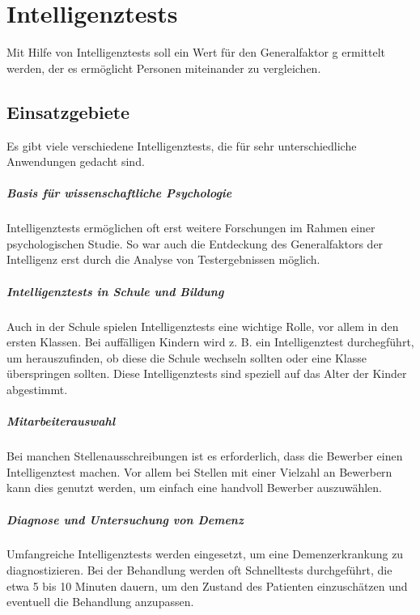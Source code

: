 \chapter{Intelligenztests}
Mit Hilfe von Intelligenztests soll ein Wert für den Generalfaktor g ermittelt werden, der es ermöglicht Personen miteinander zu vergleichen.

\section{Einsatzgebiete}
Es gibt viele verschiedene Intelligenztests, die für sehr unterschiedliche Anwendungen gedacht sind.

\paragraph{Basis für wissenschaftliche Psychologie}
Intelligenztests ermöglichen oft erst weitere Forschungen im Rahmen einer psychologischen Studie. So war auch die Entdeckung des Generalfaktors der Intelligenz erst durch die Analyse von Testergebnissen möglich.

\paragraph{Intelligenztests in Schule und Bildung}
Auch in der Schule spielen Intelligenztests eine wichtige Rolle, vor allem in den ersten Klassen. Bei auffälligen Kindern wird z. B. ein Intelligenztest durchegführt, um herauszufinden, ob diese die Schule wechseln sollten oder eine Klasse überspringen sollten. Diese Intelligenztests sind speziell auf das Alter der Kinder abgestimmt.

\paragraph{Mitarbeiterauswahl}
Bei manchen Stellenausschreibungen ist es erforderlich, dass die Bewerber einen Intelligenztest machen. Vor allem bei Stellen mit einer Vielzahl an Bewerbern kann dies genutzt werden, um einfach eine handvoll Bewerber auszuwählen.

\paragraph{Diagnose und Untersuchung von Demenz}
Umfangreiche Intelligenztests werden eingesetzt, um eine Demenzerkrankung zu diagnostizieren. Bei der Behandlung werden oft Schnelltests durchgeführt, die etwa 5 bis 10 Minuten dauern, um den Zustand des Patienten einzuschätzen und eventuell die Behandlung anzupassen.

